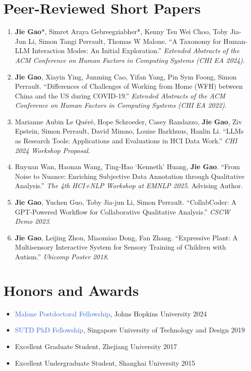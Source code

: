 \documentclass[11pt, letterpaper]{article}
\begin{document}
\section{Peer-Reviewed Short Papers}
\begin{enumerate}[leftmargin=1.5em, itemsep=6pt]
\item \textbf{Jie Gao}*, Simret Araya Gebreegziabher*, Kenny Tsu Wei Choo, Toby Jia-Jun Li, Simon Tangi Perrault, Thomas W Malone. ``A Taxonomy for Human-LLM Interaction Modes: An Initial Exploration.'' \textit{Extended Abstracts of the ACM Conference on Human Factors in Computing Systems (CHI EA 2024)}.

\item \textbf{Jie Gao}, Xiayin Ying, Junming Cao, Yifan Yang, Pin Sym Foong, Simon Perrault. ``Differences of Challenges of Working from Home (WFH) between China and the US during COVID-19.'' \textit{Extended Abstracts of the ACM Conference on Human Factors in Computing Systems (CHI EA 2022)}.

\item Marianne Aubin Le Qu\'{e}r\'{e}, Hope Schroeder, Casey Randazzo, \textbf{Jie Gao}, Ziv Epstein, Simon Perrault, David Mimno, Louise Barkhuus, Hanlin Li. ``LLMs as Research Tools: Applications and Evaluations in HCI Data Work.'' \textit{CHI 2024 Workshop Proposal}.

\item Ruyuan Wan, Haonan Wang, Ting-Hao `Kenneth' Huang, \textbf{Jie Gao}. ``From Noise to Nuance: Enriching Subjective Data Annotation through Qualitative Analysis.'' \textit{The 4th HCI+NLP Workshop at EMNLP 2025}. Advising Author.

\item \textbf{Jie Gao}, Yuchen Guo, Toby Jia-jun Li, Simon Perrault. ``CollabCoder: A GPT-Powered Workflow for Collaborative Qualitative Analysis.'' \textit{CSCW Demo 2023}.

\item \textbf{Jie Gao}, Leijing Zhou, Miaomiao Dong, Fan Zhang. ``Expressive Plant: A Multisensory Interactive System for Sensory Training of Children with Autism.'' \textit{Ubicomp Poster 2018}.
\end{enumerate}

\section{Honors and Awards}
\begin{itemize}[itemsep=4pt]
\item \textcolor{highlight}{Malone Postdoctoral Fellowship}, Johns Hopkins University \hfill 2024
\item \textcolor{highlight}{SUTD PhD Fellowship}, Singapore University of Technology and Design \hfill 2019
\item Excellent Graduate Student, Zhejiang University \hfill 2017
\item Excellent Undergraduate Student, Shanghai University \hfill 2015
\end{itemize}
\end{document}
